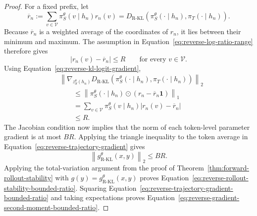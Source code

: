 \documentclass{article} %
\theoremstyle{plain}
\theoremstyle{definition}
\theoremstyle{remark}
\begin{document}
\begin{proof}
For a fixed prefix, let
\begin{equation}
    \overline r_n
    :=
    \sum_{v\in\mathcal V}
    \pi_S^\theta(v\mid h_n)r_n(v)
    =
    D_{\mathrm{R\text{-}KL}}\left(
        \pi_S^\theta(\cdot\mid h_n),
        \pi_T(\cdot\mid h_n)
    \right).
    \label{eq:reverse-mean-log-ratio}
\end{equation}
Because $\overline r_n$ is a weighted average of the coordinates of
$r_n$, it lies between their minimum and maximum.  The assumption in
Equation~\ref{eq:reverse-log-ratio-range} therefore gives
\begin{equation}
    \left|r_n(v)-\overline r_n\right|\le R
    \qquad\text{for every }v\in\mathcal V.
    \label{eq:centered-log-ratio-bound}
\end{equation}
Using Equation~\ref{eq:reverse-kl-logit-gradient},
\begin{align}
    &\left\lVert
        \nabla_{z_S^\theta(h_n)}
        D_{\mathrm{R\text{-}KL}}\left(
            \pi_S^\theta(\cdot\mid h_n),
            \pi_T(\cdot\mid h_n)
        \right)
    \right\rVert_2\nonumber\\
    &\qquad\le
    \left\lVert
        \pi_S^\theta(\cdot\mid h_n)
        \odot(r_n-\overline r_n\mathbf1)
    \right\rVert_1\\
    &\qquad=
    \sum_{v\in\mathcal V}
    \pi_S^\theta(v\mid h_n)
    \left|r_n(v)-\overline r_n\right|\\
    &\qquad\le R.
    \label{eq:reverse-logit-gradient-bounded-ratio}
\end{align}
The Jacobian condition now implies that the norm of each token-level parameter
gradient is at most $BR$.  Applying the triangle inequality to the token
average in Equation~\ref{eq:reverse-trajectory-gradient} gives
\begin{equation}
    \left\lVert
        g_{\mathrm{R\text{-}KL}}^\theta(x,y)
    \right\rVert_2
    \le BR.
    \label{eq:reverse-trajectory-gradient-bounded-ratio}
\end{equation}
Applying the total-variation argument from the proof of
Theorem~\ref{thm:forward-rollout-stability} with
$g(y)=g_{\mathrm{R\text{-}KL}}^\theta(x,y)$ proves
Equation~\ref{eq:reverse-rollout-stability-bounded-ratio}.  Squaring
Equation~\ref{eq:reverse-trajectory-gradient-bounded-ratio} and taking
expectations proves Equation~\ref{eq:reverse-gradient-second-moment-bounded-ratio}.
\end{proof}
\end{document}
